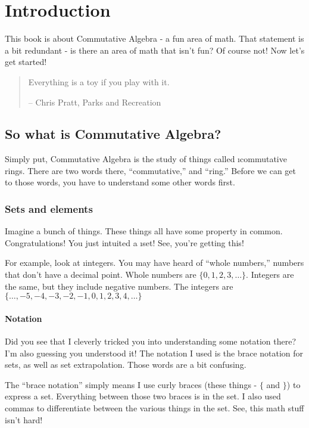 \chapter{Introduction}

This book is about Commutative Algebra - a fun area of math. That statement is a
bit redundant - is there an area of math that isn't fun? Of course not! Now
let's get started!

\begin{quotation}
  Everything is a toy if you play with it.

  -- Chris Pratt, Parks and Recreation
\end{quotation}


\section{So what is Commutative Algebra?}

Simply put, Commutative Algebra is the study of things called \i{commutative
  rings}. There are two words there, ``commutative,'' and ``ring.'' Before we
can get to those words, you have to understand some other words first.


\subsection{Sets and elements}

Imagine a bunch of things. These things all have some property in
common. Congratulations! You just intuited a \i{set}! See, you're getting this!

For example, look at \i{integers}. You may have heard of ``whole numbers,''
numbers that don't have a decimal point. Whole numbers are $\{0, 1, 2, 3,
\ldots\}$. Integers are the same, but they include negative numbers. The
integers are $\{\ldots, -5, -4, -3, -2, -1, 0, 1, 2, 3, 4, \ldots\}$

\subsubsection{Notation}

Did you see that I cleverly tricked you into understanding some notation there?
I'm also guessing you understood it! The notation I used is the brace notation
for sets, as well as set extrapolation. Those words are a bit confusing.

The ``brace notation'' simply means I use curly braces (these things - $\{$ and
$\}$) to express a set. Everything between those two braces is in the set. I
also used commas to differentiate between the various things in the set. See,
this math stuff isn't hard!

